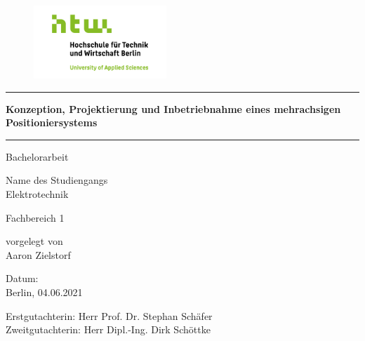 \documentclass[12pt, a4paper, twoside]{article} %
\begin{document}
\begin{titlepage}

	\vspace*{-2.0cm}

	\begin{figure}[h]\centering
		\includegraphics[width=5cm]{Images/HTW_Logo.png}
	\end{figure}

	\begin{center}
	\vspace*{-1.59cm}

	\par\noindent\rule{\textwidth}{0.4pt}
	\huge
	\textcolor{htw}{\textbf{Konzeption, Projektierung und Inbetriebnahme eines mehrachsigen Positioniersystems}}
	\par\noindent\rule{\textwidth}{0.4pt}
	\vspace*{2.0cm}
	\Large
	Bachelorarbeit
	
	\normalsize
	Name des Studiengangs\\
	\vspace*{0.4cm}
	\Large
	Elektrotechnik
	
	\vspace*{0.6cm}
	\Large
	\textcolor{htw}{Fachbereich 1}
	
	\vspace*{0.6cm}
	\normalsize
	vorgelegt von\\
	\vspace*{0.4cm}
	\Large
	Aaron Zielstorf
	
	\vspace*{3.0cm}
	\small
	Datum:\\
	\normalsize
	Berlin, 04.06.2021
	
	\vspace*{1.6cm}
	\normalsize
	Erstgutachter\textunderscore in: Herr Prof. Dr. Stephan Schäfer\\
	Zweitgutachter\textunderscore in: Herr Dipl.-Ing. Dirk Schöttke
	
	\end{center}
\end{titlepage}


\setcounter{tocdepth}{2} %
\tableofcontents
\thispagestyle{empty}
\clearpage
\end{document}
